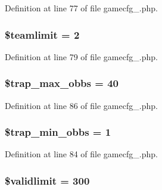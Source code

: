Definition at line 77 of file gamecfg\+\_.\+php.

\hypertarget{gamecfg__1_8php_a35de88749c1c10aff2c721b63ba038f5}{
\subsubsection[{\$teamlimit}]{\setlength{\rightskip}{0pt plus 5cm}\$teamlimit = 2}}\label{gamecfg__1_8php_a35de88749c1c10aff2c721b63ba038f5}


Definition at line 79 of file gamecfg\+\_.\+php.

\hypertarget{gamecfg__1_8php_a9d92ed0c2b746222f83ba28a09a0d731}{
\subsubsection[{\$trap\+\_\+max\+\_\+obbs}]{\setlength{\rightskip}{0pt plus 5cm}\$trap\+\_\+max\+\_\+obbs = 40}}\label{gamecfg__1_8php_a9d92ed0c2b746222f83ba28a09a0d731}


Definition at line 86 of file gamecfg\+\_.\+php.

\hypertarget{gamecfg__1_8php_a0ed154a4bb0be6af71ede7fbfaa98d6d}{
\subsubsection[{\$trap\+\_\+min\+\_\+obbs}]{\setlength{\rightskip}{0pt plus 5cm}\$trap\+\_\+min\+\_\+obbs = 1}}\label{gamecfg__1_8php_a0ed154a4bb0be6af71ede7fbfaa98d6d}


Definition at line 84 of file gamecfg\+\_.\+php.

\hypertarget{gamecfg__1_8php_a6cef405cbc58b7aca1af459df00ac50c}{
\subsubsection[{\$validlimit}]{\setlength{\rightskip}{0pt plus 5cm}\$validlimit = 300}}\label{gamecfg__1_8php_a6cef405cbc58b7aca1af459df00ac50c}


